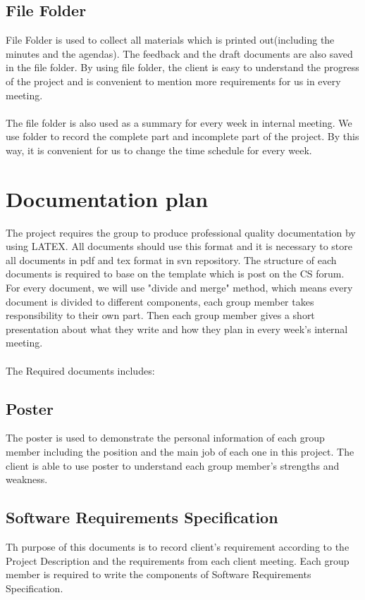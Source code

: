 \documentclass[11pt, a4paper]{report}
\begin{document}
\subsection{File Folder}
File Folder is used to collect all materials which is printed out(including the minutes and the agendas). The feedback and the draft documents are also saved in the file folder. By using file folder, the client is easy to understand the progress of the project and is convenient to mention more requirements for us in every meeting.\\
\\
The file folder is also used as a summary for every week in internal meeting. We use folder to record the complete part and incomplete part of the project. By this way, it is convenient for us to change the time schedule for every week.   

\section{Documentation plan}
The project requires the group to produce professional quality documentation by using LATEX. All documents should use this format and it is necessary to store all documents in pdf and tex format in svn repository. The structure of each documents is required to base on the template which is post on the CS forum. For every document, we will use "divide and merge" method, which means every document is divided to different components, each group member takes responsibility to their own part. Then each group member gives a short presentation about what they write and how they plan in every week's internal meeting.
 \\
\\
The Required documents includes:
\subsection{Poster}
The poster is used to demonstrate the personal information of each group member including the position and the main job of each one in this project. The client is able to use poster to understand each group member's strengths and weakness.
\subsection{Software Requirements Specification}
Th purpose of this documents is to record client's requirement according to the Project Description and the requirements from each client meeting. Each group member is required to write the components of Software Requirements Specification. 
\end{document}
